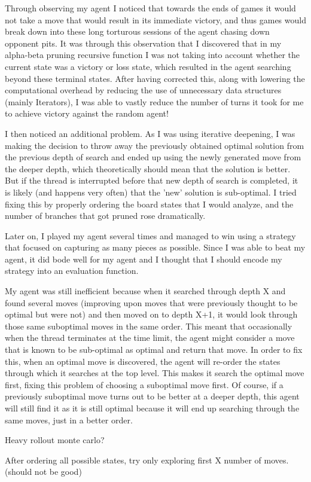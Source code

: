 \documentclass{article}
\begin{document}
Through observing my agent I noticed that towards the ends of games it would not take a move that would result in its immediate victory, and thus
games would break down into these long torturous sessions of the agent chasing down opponent pits. It was through this observation that
I discovered that in my alpha-beta pruning recursive function I was not taking into account whether the current state was a victory or loss state,
which resulted in the agent searching beyond these terminal states. After having corrected this, along with lowering the computational overhead by reducing
the use of unnecessary data structures (mainly Iterators), I was able to vastly reduce the number of turns it took for me to achieve victory against 
the random agent!

I then noticed an additional problem. As I was using iterative deepening, I was making the decision to throw away the previously obtained optimal solution from the
previous depth of search and ended up using the newly generated move from the deeper depth, which theoretically should mean that the solution is better. But if the thread
is interrupted before that new depth of search is completed, it is likely (and happens very often) that the 'new' solution is sub-optimal. I tried fixing this by properly ordering
the board states that I would analyze, and the number of branches that got pruned rose dramatically.

Later on, I played my agent several times and managed to win using a strategy that focused on capturing as many pieces as possible. Since I was able to beat my agent, it
did bode well for my agent and I thought that I should encode my strategy into an evaluation function.

My agent was still inefficient because when it searched through depth X and found several moves (improving upon moves that were previously thought to be optimal but were not)
and then moved on to depth X+1, it would look through those same suboptimal moves in the same order. This meant that occasionally when the thread terminates at the time
limit, the agent might consider a move that is known to be sub-optimal as optimal and return that move. In order to fix this, when an optimal move is discovered, the agent
will re-order the states through which it searches at the top level. This makes it search the optimal move first, fixing this problem of choosing a suboptimal move first.
Of course, if a previously suboptimal move turns out to be better at a deeper depth, this agent will still find it as it is still optimal because it will end up searching
through the same moves, just in a better order.

Heavy rollout monte carlo?

After ordering all possible states, try only exploring first X number of moves. (should not be good)
\end{document}
